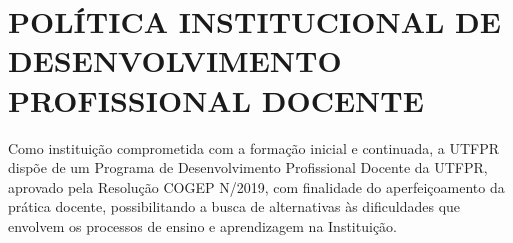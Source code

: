 \chapter{POLÍTICA INSTITUCIONAL DE DESENVOLVIMENTO PROFISSIONAL DOCENTE}

Como instituição comprometida com a formação inicial e continuada, a UTFPR dispõe de um Programa de Desenvolvimento Profissional Docente da UTFPR, aprovado pela Resolução COGEP N/2019, com finalidade do aperfeiçoamento da prática docente, possibilitando a busca de alternativas às dificuldades que envolvem os processos de ensino e aprendizagem na Instituição.